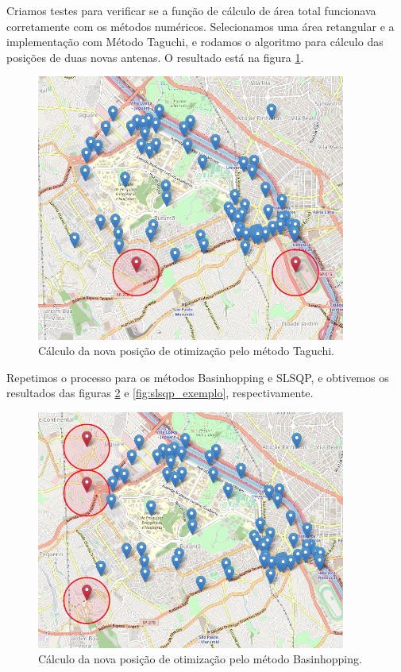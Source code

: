 \documentclass[]{politex}
\begin{document}
Criamos testes para verificar se a função de cálculo de área total funcionava
corretamente com os métodos numéricos. Selecionamos uma área retangular e a
implementação com Método Taguchi, e rodamos o algoritmo para cálculo das
posições de duas novas antenas. O resultado está na figura
\ref{fig:taguchi_exemplo}.

\begin{figure}[H]
    \centering
    \includegraphics[width=4in]{imagens/taguchi-exemplo}
    \caption{Cálculo da nova posição de otimização pelo método Taguchi.}
    \label{fig:taguchi_exemplo}
\end{figure}

Repetimos o processo para os métodos Basinhopping e SLSQP, e obtivemos os
resultados das figuras \ref{fig:basinhopping_exemplo} e \ref{fig:slsqp_exemplo},
respectivamente.

\begin{figure}[H]
    \centering
    \includegraphics[width=4in]{imagens/basinhopping-exemplo}
    \caption{Cálculo da nova posição de otimização pelo método Basinhopping.}
    \label{fig:basinhopping_exemplo}
\end{figure}
\end{document}
